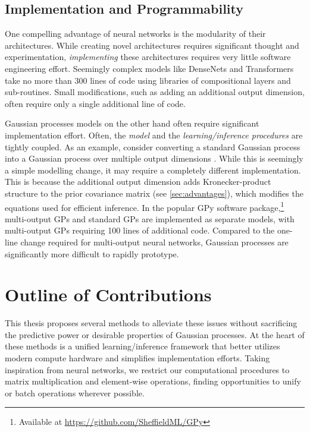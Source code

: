 \subsection{Implementation and Programmability}
One compelling advantage of neural networks is the modularity of their architectures.
While creating novel architectures requires significant thought and experimentation, \emph{implementing} these architectures requires very little software engineering effort.
Seemingly complex models like DenseNets \cite{huang2017densely} and Transformers \cite{vaswani2017attention} take no more than 300 lines of code using libraries of compositional layers and sub-routines.
Small modifications, such as adding an additional output dimension, often require only a single additional line of code.

Gaussian processes models on the other hand often require significant implementation effort.
Often, the \emph{model} and the \emph{learning/inference procedures} are tightly coupled.
As an example, consider converting a standard Gaussian process into a Gaussian process over multiple output dimensions \cite{bonilla2008multi}.
While this is seemingly a simple modelling change, it may require a completely different implementation.
This is because the additional output dimension adds Kronecker-product structure to the prior covariance matrix (see \cref{sec:advantages}), which modifies the equations used for efficient inference.
In the popular GPy software package,\footnote{
	Available at \url{https://github.com/SheffieldML/GPy}
} multi-output GPs and standard GPs are implemented as separate models, with multi-output GPs requiring 100 lines of additional code.
Compared to the one-line change required for multi-output neural networks, Gaussian processes are significantly more difficult to rapidly prototype.


\section{Outline of Contributions}

This thesis proposes several methods to alleviate these issues without sacrificing the predictive power or desirable properties of Gaussian processes.
At the heart of these methods is a unified learning/inference framework that better utilizes modern compute hardware and simplifies implementation efforts.
Taking inspiration from neural networks, we restrict our computational procedures to matrix multiplication and element-wise operations, finding opportunities to unify or batch operations wherever possible.

